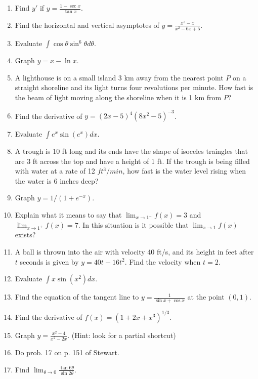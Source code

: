 \documentclass[12pt]{article}
\begin{document}
\begin{enumerate}[(1)]
\item
Find $y'$ if $y = \frac{1 - \sec x}{\tan x}$.

\item
Find the horizontal and vertical asymptotes of $y = \frac{x^3 - x}{x^2 - 6x + 5}$.

\item
Evaluate $\int \cos \theta \sin^6 \theta d \theta$.

\item
Graph $y = x - \ln x$.

\item
A lighthouse is on a small island 3 km away from the nearest point $P$ on a straight
shoreline and its light turns four revolutions per minute. How fast is the beam of light
moving along the shoreline when it is 1 km from $P$?

\item
Find the derivative of $y = (2x - 5)^4 (8 x^2 - 5)^{-3}$.

\item
Evaluate $\int e^x \sin(e^x) dx$.

\item
A trough is 10 ft long and its ends have the shape of isoceles traingles that
are 3 ft across the top and have a height of 1 ft. If the trough is being filled with
water at a rate of 12 $ft^3/min$, how fast is the water level rising when the water
is 6 inches deep?

\item
Graph $y = 1/(1 + e^{-x})$.

\item
Explain what it means to say that $\lim_{x \rightarrow 1^-} f(x) = 3$ and
$\lim_{x \rightarrow 1^+} f(x) = 7$. In this situation is it possible that
$\lim_{x \rightarrow 1} f(x)$ exists?

\item
A ball is thrown into the air with velocity 40 ft/s, and its height in feet after
$t$ seconds is given by $y = 40t - 16t^2$. Find the velocity when $t = 2$.

\item
Evaluate $\int x \sin(x^2) dx$.

\item
Find the equation of the tangent line to $y = \frac{1}{\sin x + \cos x}$ at the point
$(0, 1)$.

\item
Find the derivative of $f(x) = (1 + 2x + x^3)^{1/3}$.

\item
Graph $y = \frac{x^2 - 4}{x^2 - 2x}$. (Hint: look for a partial shortcut)
\item
Do prob. 17 on p. 151 of Stewart.

\item
Find $\lim_{\theta \rightarrow 0} \frac{\tan 6 \theta}{\sin 2 \theta}$.

\end{enumerate}
\end{document}

